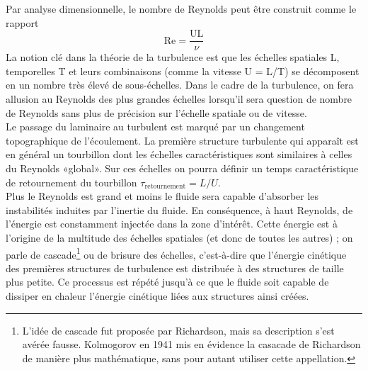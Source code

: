 \documentclass[a4paper,12pt]{article}
\newcommand{\cad}{c'est-à-dire}
\numberwithin{equation}{section} %
\begin{document}
\noindent  Par analyse dimensionnelle, le nombre de Reynolds peut être construit comme le rapport 
\begin{equation}
 \text{Re} = \frac{\text{UL}}{\nu}
\end{equation} 
 La notion clé dans la théorie de la turbulence est que les échelles spatiales L, temporelles T et leurs combinaisons (comme la vitesse U = L/T) se décomposent en un nombre très élevé de sous-échelles.
Dans le cadre de la turbulence, on fera allusion au Reynolds des plus grandes échelles lorsqu'il sera question de nombre de Reynolds sans plus de précision sur l'échelle spatiale ou de vitesse. \\
Le passage du laminaire au turbulent est marqué par un changement topographique de l'écoulement. La première structure turbulente qui apparaît est en général un tourbillon dont les échelles caractéristiques sont similaires à celles du Reynolds «global». Sur ces échelles on pourra définir un temps caractéristique de retournement du tourbillon $\tau_{\text{retournement}} = L/U$. \\
Plus le Reynolds est grand et moins le fluide sera capable d'absorber les instabilités induites par l'inertie du fluide. En conséquence, à haut Reynolds, de l'énergie est constamment injectée dans la zone d'intérêt. Cette énergie est à l'origine de la multitude des échelles spatiales (et donc de toutes les autres) ; on parle de cascade\footnote{L'idée de cascade fut proposée par Richardson, mais sa description s'est avérée fausse. Kolmogorov en 1941 mis en évidence la casacade de Richardson de manière plus mathématique, sans pour autant utiliser cette appellation.} ou de brisure des échelles, \cad $ $ que l'énergie cinétique des premières structures de turbulence est distribuée à des structures de taille plus petite. Ce processus est répété jusqu'à ce que le fluide soit capable de dissiper en chaleur l'énergie cinétique liées aux structures ainsi créées. \\
\end{document}
